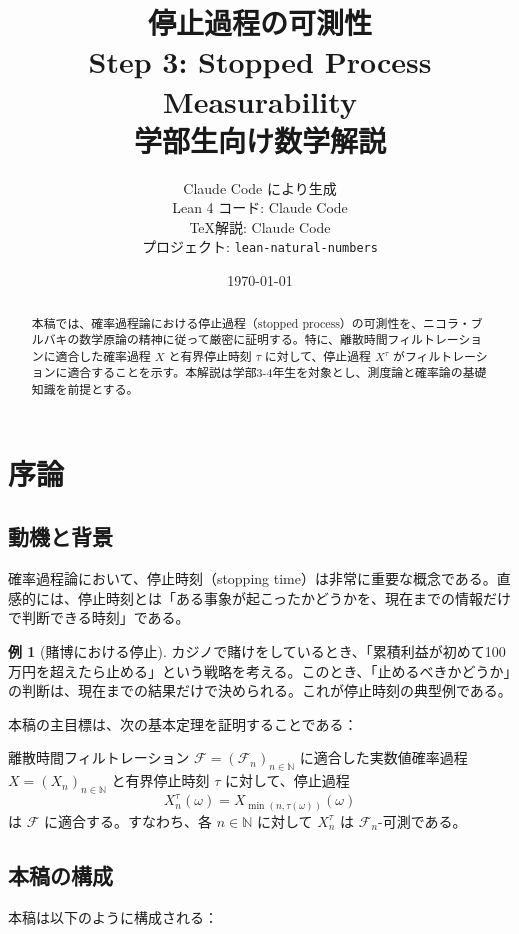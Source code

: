 \documentclass[a4paper,12pt]{ltjsarticle}
\title{停止過程の可測性\\
  {\large Step 3: Stopped Process Measurability}\\
  {\large 学部生向け数学解説}}
\author{Claude Code により生成\\
  {\small Lean 4 コード: Claude Code}\\
  {\small \TeX 解説: Claude Code}\\
  {\small プロジェクト: \texttt{lean-natural-numbers}}}
\date{\today}
\theoremstyle{definition}
\newtheorem{example}[theorem]{例}
\newcommand{\N}{\mathbb{N}}
\newcommand{\F}{\mathcal{F}}
\begin{document}
\maketitle

\begin{abstract}
本稿では、確率過程論における停止過程（stopped process）の可測性を、ニコラ・ブルバキの数学原論の精神に従って厳密に証明する。特に、離散時間フィルトレーションに適合した確率過程 $X$ と有界停止時刻 $\tau$ に対して、停止過程 $X^\tau$ がフィルトレーションに適合することを示す。本解説は学部3-4年生を対象とし、測度論と確率論の基礎知識を前提とする。
\end{abstract}

\tableofcontents

\section{序論}

\subsection{動機と背景}

確率過程論において、停止時刻（stopping time）は非常に重要な概念である。直感的には、停止時刻とは「ある事象が起こったかどうかを、現在までの情報だけで判断できる時刻」である。

\begin{example}[賭博における停止]
カジノで賭けをしているとき、「累積利益が初めて100万円を超えたら止める」という戦略を考える。このとき、「止めるべきかどうか」の判断は、現在までの結果だけで決められる。これが停止時刻の典型例である。
\end{example}

本稿の主目標は、次の基本定理を証明することである：

\begin{maintheorem}[主定理]
離散時間フィルトレーション $\F = (\F_n)_{n \in \N}$ に適合した実数値確率過程 $X = (X_n)_{n \in \N}$ と有界停止時刻 $\tau$ に対して、停止過程
\[
X^\tau_n(\omega) = X_{\min(n, \tau(\omega))}(\omega)
\]
は $\F$ に適合する。すなわち、各 $n \in \N$ に対して $X^\tau_n$ は $\F_n$-可測である。
\end{maintheorem}

\subsection{本稿の構成}

本稿は以下のように構成される：
\end{document}
